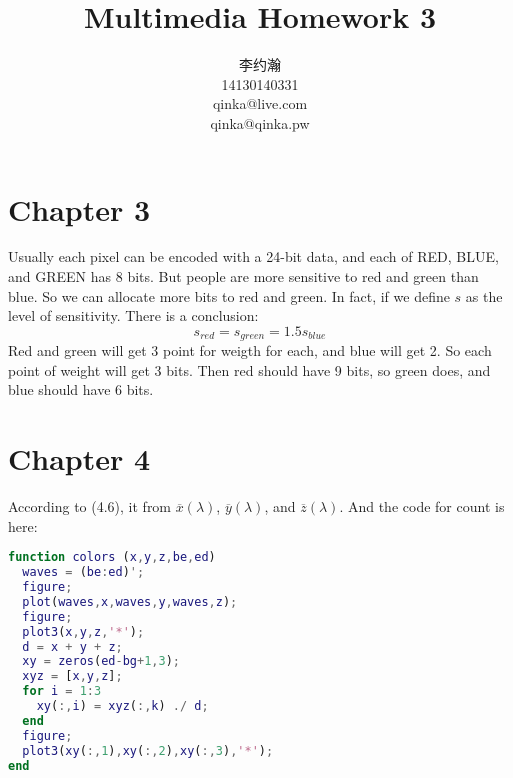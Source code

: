 \documentclass{ctexart}
\author{李约瀚 \\ 14130140331 \\ qinka@live.com \\ qinka@qinka.pw}
\title{Multimedia Homework 3}
\begin{document}
\maketitle

\section{Chapter 3}

Usually each pixel can be encoded with a 24-bit data, and each of RED, BLUE, and GREEN has 8 bits. But people are more sensitive to red and green than blue.
So we can allocate more bits to red and green. In fact, if we define $s$ as the level of sensitivity. There is a conclusion:
$$s_{red} = s_{green} = 1.5s_{blue}$$
Red and green will get 3 point for weigth for each, and blue will get 2. So each point of weight will get 3 bits.
Then red should have 9 bits, so green does, and blue should have 6 bits.

\section{Chapter 4}

According to (4.6), it from $\overline{x}(\lambda)$, $\overline{y}(\lambda)$, and $\overline{z}(\lambda)$.
And the code for count is here:
\begin{lstlisting}[language=Matlab]
function colors (x,y,z,be,ed)
  waves = (be:ed)';
  figure;
  plot(waves,x,waves,y,waves,z);
  figure;
  plot3(x,y,z,'*');
  d = x + y + z;
  xy = zeros(ed-bg+1,3);
  xyz = [x,y,z];
  for i = 1:3
    xy(:,i) = xyz(:,k) ./ d;
  end
  figure;
  plot3(xy(:,1),xy(:,2),xy(:,3),'*');
end
\end{lstlisting}
\end{document}
